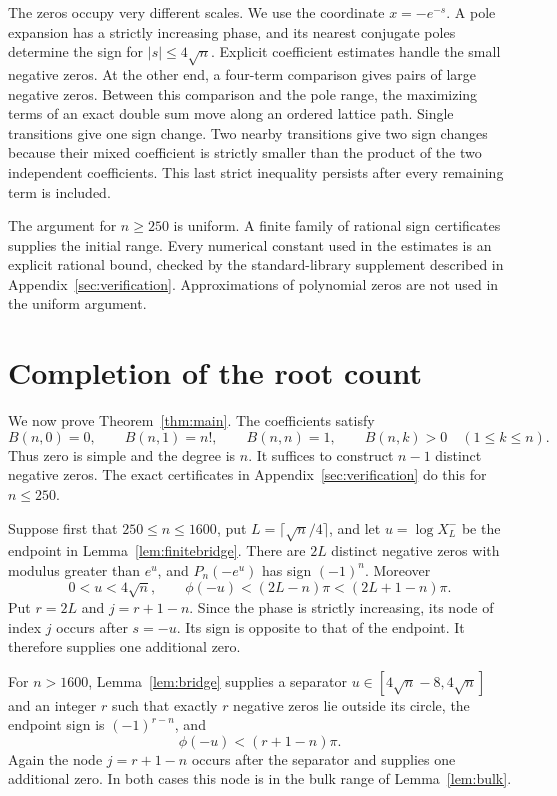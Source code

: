 \documentclass[11pt]{amsart}
\theoremstyle{definition}
\begin{document}
The zeros occupy very different scales. We use the coordinate $x=-e^{-s}$. A pole expansion has a strictly increasing phase, and its nearest conjugate poles determine the sign for $|s|\le4\sqrt n$. Explicit coefficient estimates handle the small negative zeros. At the other end, a four-term comparison gives pairs of large negative zeros. Between this comparison and the pole range, the maximizing terms of an exact double sum move along an ordered lattice path. Single transitions give one sign change. Two nearby transitions give two sign changes because their mixed coefficient is strictly smaller than the product of the two independent coefficients. This last strict inequality persists after every remaining term is included.

The argument for $n\ge250$ is uniform. A finite family of rational sign certificates supplies the initial range. Every numerical constant used in the estimates is an explicit rational bound, checked by the standard-library supplement described in Appendix~\ref{sec:verification}. Approximations of polynomial zeros are not used in the uniform argument.







\section{Completion of the root count}\label{sec:count}
We now prove Theorem~\ref{thm:main}. The coefficients satisfy
\[
B(n,0)=0,\qquad B(n,1)=n!,\qquad B(n,n)=1,
\qquad B(n,k)>0\quad(1\le k\le n).
\]
Thus zero is simple and the degree is $n$. It suffices to construct $n-1$ distinct negative zeros. The exact certificates in Appendix~\ref{sec:verification} do this for $n\le250$.

Suppose first that $250\le n\le1600$, put $L=\lceil\sqrt n/4\rceil$, and let $u=\log X_L^-$ be the endpoint in Lemma~\ref{lem:finitebridge}. There are $2L$ distinct negative zeros with modulus greater than $e^u$, and $P_n(-e^u)$ has sign $(-1)^n$. Moreover
\[
0<u<4\sqrt n,\qquad
\phi(-u)<(2L-n)\pi<(2L+1-n)\pi.
\]
Put $r=2L$ and $j=r+1-n$. Since the phase is strictly increasing, its node of index $j$ occurs after $s=-u$. Its sign is opposite to that of the endpoint. It therefore supplies one additional zero.

For $n>1600$, Lemma~\ref{lem:bridge} supplies a separator $u\in[4\sqrt n-8,4\sqrt n]$ and an integer $r$ such that exactly $r$ negative zeros lie outside its circle, the endpoint sign is $(-1)^{r-n}$, and
\[
\phi(-u)<(r+1-n)\pi.
\]
Again the node $j=r+1-n$ occurs after the separator and supplies one additional zero. In both cases this node is in the bulk range of Lemma~\ref{lem:bulk}.
\end{document}
